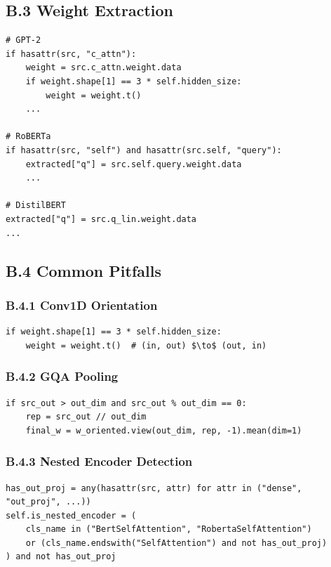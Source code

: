 \subsection{B.3 Weight Extraction}

\begin{lstlisting}
# GPT-2
if hasattr(src, "c_attn"):
    weight = src.c_attn.weight.data
    if weight.shape[1] == 3 * self.hidden_size:
        weight = weight.t()
    ...

# RoBERTa
if hasattr(src, "self") and hasattr(src.self, "query"):
    extracted["q"] = src.self.query.weight.data
    ...

# DistilBERT
extracted["q"] = src.q_lin.weight.data
...
\end{lstlisting}

\subsection{B.4 Common Pitfalls}

\subsubsection{B.4.1 Conv1D Orientation}

\begin{lstlisting}
if weight.shape[1] == 3 * self.hidden_size:
    weight = weight.t()  # (in, out) $\to$ (out, in)
\end{lstlisting}

\subsubsection{B.4.2 GQA Pooling}

\begin{lstlisting}
if src_out > out_dim and src_out % out_dim == 0:
    rep = src_out // out_dim
    final_w = w_oriented.view(out_dim, rep, -1).mean(dim=1)
\end{lstlisting}

\subsubsection{B.4.3 Nested Encoder Detection}

\begin{lstlisting}
has_out_proj = any(hasattr(src, attr) for attr in ("dense", "out_proj", ...))
self.is_nested_encoder = (
    cls_name in ("BertSelfAttention", "RobertaSelfAttention")
    or (cls_name.endswith("SelfAttention") and not has_out_proj)
) and not has_out_proj
\end{lstlisting}

